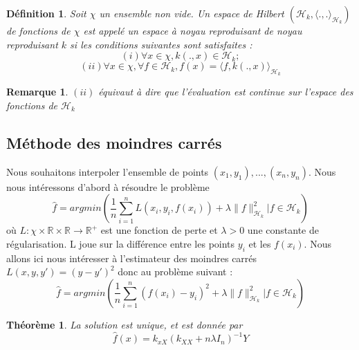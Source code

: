 \documentclass[a4paper,12pt]{article}
\newtheorem{definition}{Définition}
\newtheorem{theorem}{Théorème}
\newtheorem{remark}{Remarque}
\begin{document}
\begin{definition}
    Soit $\chi$ un ensemble non vide. Un espace de Hilbert $(\mathcal{H}_k,\langle .,.\rangle_{\mathcal{H}_k})$ de fonctions de $\chi$ est appelé un espace à noyau reproduisant de noyau reproduisant $k$ si les conditions suivantes sont satisfaites :
$$
(i) \forall x\in\chi, k(.,x)\in\mathcal{H}_k;
$$
$$
(ii) \forall x\in\chi,\forall f\in\mathcal{H}_k,f(x)=\langle f,k(.,x)\rangle_{\mathcal{H}_k}
$$
\end{definition}

\begin{remark}
    $(ii)$ équivaut à dire que l'évaluation est continue sur l'espace des fonctions de $\mathcal{H}_k$
\end{remark}

\subsection{Méthode des moindres carrés}

Nous souhaitons interpoler l'ensemble de points ${(x_1,y_1),...,(x_n,y_n)}$.
Nous nous intéressons d'abord à résoudre le problème 
$$
\hat{f} = argmin(\frac{1}{n}\sum_{i=1}^nL(x_i,y_i,f(x_i))+\lambda\lVert f\rVert_{\mathcal{H}_k}^2 | f\in\mathcal{H}_k)
$$
où $L:\chi\times\mathbb{R}\times\mathbb{R}\to\mathbb{R}^{+}$ est une fonction de perte et $\lambda >0$ une constante de régularisation. L joue sur la différence entre les points $y_i$ et les $f(x_i)$. Nous allons ici nous intéresser à l'estimateur des moindres carrés $L(x,y,y')=(y-y')^2$ donc au problème suivant :
$$
\hat{f} = argmin(\frac{1}{n}\sum_{i=1}^n(f(x_i)-y_i)^2+\lambda\lVert f\rVert_{\mathcal{H}_k}^2 | f\in\mathcal{H}_k)
$$

\begin{theorem}
    La solution est unique, et est donnée par
$$
\hat{f}(x)=k_{xX}(k_{XX}+n\lambda I_{n})^{-1}Y
$$
\end{theorem}
\end{document}
